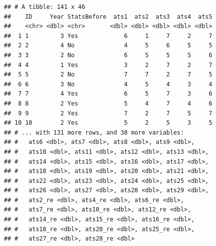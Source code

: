 \documentclass[12pt,]{book}
\newenvironment{Shaded}{\begin{snugshade}}{\end{snugshade}}
\newcommand{\DataTypeTok}[1]{\textcolor[rgb]{0.13,0.29,0.53}{#1}}
\newcommand{\DecValTok}[1]{\textcolor[rgb]{0.00,0.00,0.81}{#1}}
\newcommand{\KeywordTok}[1]{\textcolor[rgb]{0.13,0.29,0.53}{\textbf{#1}}}
\newcommand{\NormalTok}[1]{#1}
\newcommand{\OperatorTok}[1]{\textcolor[rgb]{0.81,0.36,0.00}{\textbf{#1}}}
\newcommand{\StringTok}[1]{\textcolor[rgb]{0.31,0.60,0.02}{#1}}
\begin{document}
\begin{Shaded}
\end{Shaded}

\begin{verbatim}
## # A tibble: 141 x 46
##    ID     Year StatsBefore  ats1  ats2  ats3  ats4  ats5
##    <chr> <dbl> <chr>       <dbl> <dbl> <dbl> <dbl> <dbl>
##  1 1         3 Yes             6     1     7     2     7
##  2 2         4 No              4     5     6     5     5
##  3 3         2 No              6     5     5     5     6
##  4 4         1 Yes             3     2     7     2     7
##  5 5         2 No              7     7     2     7     5
##  6 6         3 No              4     5     4     3     4
##  7 7         4 Yes             6     5     7     3     6
##  8 8         2 Yes             5     4     7     4     6
##  9 9         2 Yes             7     2     7     5     7
## 10 10        2 Yes             5     2     5     3     5
## # ... with 131 more rows, and 38 more variables:
## #   ats6 <dbl>, ats7 <dbl>, ats8 <dbl>, ats9 <dbl>,
## #   ats10 <dbl>, ats11 <dbl>, ats12 <dbl>, ats13 <dbl>,
## #   ats14 <dbl>, ats15 <dbl>, ats16 <dbl>, ats17 <dbl>,
## #   ats18 <dbl>, ats19 <dbl>, ats20 <dbl>, ats21 <dbl>,
## #   ats22 <dbl>, ats23 <dbl>, ats24 <dbl>, ats25 <dbl>,
## #   ats26 <dbl>, ats27 <dbl>, ats28 <dbl>, ats29 <dbl>,
## #   ats2_re <dbl>, ats4_re <dbl>, ats6_re <dbl>,
## #   ats7_re <dbl>, ats10_re <dbl>, ats12_re <dbl>,
## #   ats14_re <dbl>, ats15_re <dbl>, ats16_re <dbl>,
## #   ats18_re <dbl>, ats20_re <dbl>, ats25_re <dbl>,
## #   ats27_re <dbl>, ats28_re <dbl>
\end{verbatim}
\end{document}
